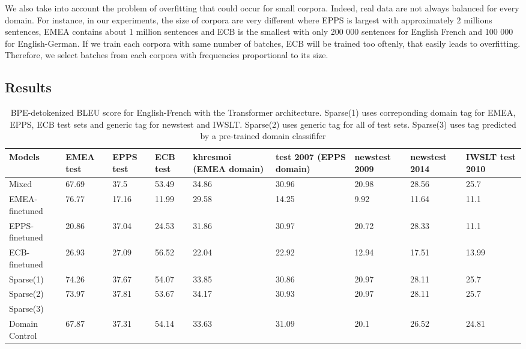 \documentclass[11pt,a4paper]{article}
\newcommand{\fyTodo}[1]{\Todo[FY:]{\textcolor{orange}{#1}}}
\begin{document}
We also take into account the problem of overfitting that could occur for small corpora. Indeed, real data are not always balanced for every domain. For instance, in our experiments, the size of corpora are very different where EPPS is largest with approximately 2 millions sentences, EMEA contains about 1 million sentences and ECB is the smallest with only 200 000 sentences for English French and 100 000 for English-German. If we train each corpora with same number of batches, ECB will be trained too oftenly, that easily leads to overfitting. Therefore, we select batches from each corpora with frequencies proportional to its size. \fyTodo{Refs on this ? or contrast ?}

\subsection{Results}
\begin{table}
\begin{center}
 \begin{tabularx}{\textwidth}{|| X | X | X | X | X | X | X | X | X ||} 
 \hline
 Models & EMEA test & EPPS test & ECB test & khresmoi (EMEA domain) & test 2007 (EPPS domain) & newstest 2009 & newstest 2014 & IWSLT test 2010 \\ [0.5ex] 
 \hline\hline
 Mixed & 67.69 & 37.5 & 53.49 & 34.86 & 30.96 & 20.98 & 28.56 & 25.7 \\
 \hline
 EMEA-finetuned & 76.77 & 17.16 & 11.99 & 29.58 & 14.25 & 9.92 & 11.64 & 11.1 \\
 \hline
 EPPS-finetuned & 20.86 & 37.04 & 24.53 & 31.86 & 30.97 & 20.72 & 28.33 & 11.1 \\
 \hline
 ECB-finetuned & 26.93 & 27.09 & 56.52 & 22.04 & 22.92 & 12.94 & 17.51 & 13.99 \\
 \hline
 Sparse(1) & 74.26 & 37.67 & 54.07 & 33.85 & 30.86 & 20.97 & 28.11 & 25.7 \\
 \hline
 Sparse(2) & 73.97 & 37.81 & 53.67 & 34.17 & 30.93 & 20.97 & 28.11 & 25.7 \\
 \hline
 Sparse(3) &  &  &  &  &  &  &  & \\
 \hline
 Domain Control & 67.87 & 37.31 & 54.14 & 33.63 & 31.09 &  20.1 & 26.52 & 24.81\\
 \hline
\end{tabularx}
\end{center}

\caption{BPE-detokenized BLEU score for English-French with the Transformer architecture. Sparse(1) uses correponding domain tag for EMEA, EPPS, ECB test sets and generic tag for newstest and IWSLT. Sparse(2) uses generic tag for all of test sets. Sparse(3) uses tag predicted by a pre-trained domain classififer}
\label{tab:1}
\end{table}
\end{document}
